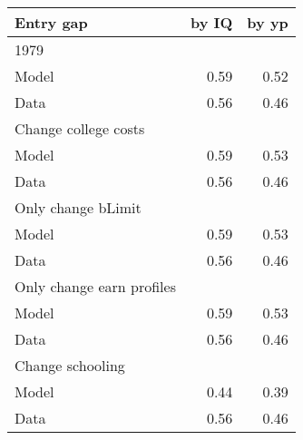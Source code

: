 \begin{tabular}{lrr}
\hline
Entry gap & by IQ  & by yp  \\ 
\hline
1979 &   &   \\ 
Model & 0.59  & 0.52  \\ 
Data & 0.56  & 0.46  \\ 
Change college costs &   &   \\ 
Model & 0.59  & 0.53  \\ 
Data & 0.56  & 0.46  \\ 
Only change bLimit &   &   \\ 
Model & 0.59  & 0.53  \\ 
Data & 0.56  & 0.46  \\ 
Only change earn profiles &   &   \\ 
Model & 0.59  & 0.53  \\ 
Data & 0.56  & 0.46  \\ 
Change schooling &   &   \\ 
Model & 0.44  & 0.39  \\ 
Data & 0.56  & 0.46  \\ 
\hline
\end{tabular}%
